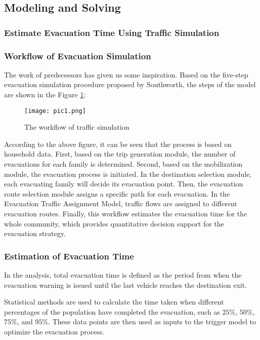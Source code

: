 \documentclass[12pt]{article}  %
\begin{document}
\subsection{Modeling and Solving}
\subsubsection{Estimate Evacuation Time Using Traffic Simulation}

\subsubsection*{Workflow of Evacuation Simulation}
The work of predecessors has given us some inspiration. Based on the five-step evacuation simulation procedure proposed by Southworth, the steps of the model are shown in the Figure \ref{pic1}:
\begin{figure}[htbp] 
	\centering  
	\texttt{[image: pic1.png]} 
	\caption{The workflow of traffic simulation}  
	\label{pic1}
\end{figure}

According to the above figure, it can be seen that the process is based on household data. First, based on the trip generation module, the number of evacuations for each family is determined. Second, based on the mobilization module, the evacuation process is initiated. In the destination selection module, each evacuating family will decide its evacuation point. Then, the evacuation route selection module assigns a specific path for each evacuation. In the Evacuation Traffic Assignment Model, traffic flows are assigned to different evacuation routes. Finally, this workflow estimates the evacuation time for the whole community, which provides quantitative decision support for the evacuation strategy.

\subsubsection*{Estimation of Evacuation Time}
In the analysis, total evacuation time is defined as the period from when the evacuation warning is issued until the last vehicle reaches the destination exit.

Statistical methods are used to calculate the time taken when different percentages of the population have completed the evacuation, such as $25\%$, $50\%$, $75\%$, and $95\%$. These data points are then used as inputs to the trigger model to optimize the evacuation process.
\end{document}

